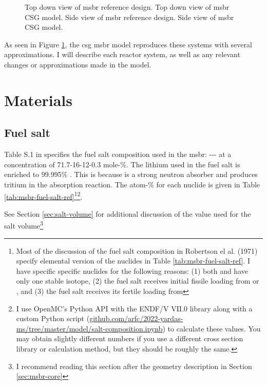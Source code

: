 \begin{figure}[htpb]
{        \label{fig:msbr-model-xz}
    }
    \caption[Full views of MSBR]{
         Top down view of \Gls{msbr} reference design.
         Top down view of \Gls{msbr} CSG model.
         Side view of \Gls{msbr} reference design.
         Side view of \Gls{msbr} CSG model.
    }
    \label{fig:msbr-overview}
\end{figure}

As seen in Figure \ref{fig:msbr-overview}, the \Gls{csg} \Gls{msbr}
model reproduces these systems with several approximations. I will
describe each reactor system, as well as any relevant changes or
approximations made in the model.

\section{Materials}
\label{sec:msbr-materials}

\subsection{Fuel salt}
\label{sub:msbr-fuel-salt}
Table S.1 in \cite{robertson_conceptual_1971} specifies the fuel salt
composition used in the \Gls{msbr}:
--- at a concentration of
71.7-16-12-0.3 mole-\%. The lithium used in the fuel salt is enriched to
99.995\% . This is because  is a strong neutron absorber
and produces tritium in the absorption reaction. The atom-\% for each nuclide is
given in Table \ref{tab:msbr-fuel-salt-ref}\footnote{Most of the discussion of
the fuel salt composition in Robertson el al. (1971)
\cite{robertson_conceptual_1971}
specify elemental version of the nuclides in Table \ref{tab:msbr-fuel-salt-ref}.
I have specific specific nuclides for the following reasons: (1) both  and
 have only one stable isotope, (2) the fuel salt receives initial fissile
loading from  or , and (3) the fuel salt receives its
fertile loading from }\footnote{I use OpenMC's Python API with the
ENDF/V VII.0 library along with a custom Python script
(\url{github.com/arfc/2022-yardas-ms/tree/master/model/salt-composition.ipynb})
to calculate these values. You may obtain slightly different numbers if you use
a different cross section library or calculation method, but they should  be
roughly the same.}.

See Section \ref{sec:salt-volume} for additional discussion of the value used
for the salt volume\footnote{I recommend reading this section after the geometry
description in Section \ref{sec:msbr-core}}

